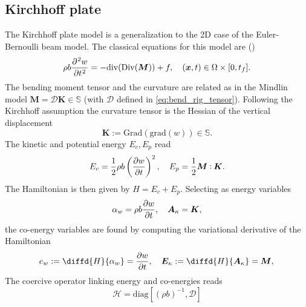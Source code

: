 \documentclass{ifacconf}
\def\onedot{$\mathsurround0pt\ldotp$}
\def\cddot{%
	\mathbin{\vcenter{\baselineskip.67ex
			\hbox{\onedot}\hbox{\onedot}}%
}}
\begin{document}
\subsection{Kirchhoff plate}
The Kirchhoff plate model is a generalization to the 2D case of the Euler-Bernoulli beam model. The classical equations for this model are (\cite{timoshenko1959theory}) 
\begin{equation}
\label{eq:clKir}
\displaystyle \rho b \diffp[2]{w}{t} = -\mathrm{div}(\mathrm{Div}(\bm{M})) + f, \quad (\bm{x}, t) \in \Omega \times [0, t_f].
\end{equation}
The bending moment tensor and the curvature are related as in the Mindlin model $\bm{M} = \mathcal{D} \bm{K} \in \mathbb{S}$ (with $\mathcal{D}$ defined in \eqref{eq:bend_rig_tensor}). Following the Kirchhoff assumption the curvature tensor is the Hessian of the vertical displacement
\begin{equation*}
\bm{K} := \mathrm{Grad}(\mathrm{grad}(w)) \in \mathbb{S}.
\end{equation*}
 The kinetic and potential energy $E_c, E_p$ read
\begin{equation}
E_c =  \frac{1}{2}\rho b \left(\diffp{w}{t} \right)^2, \quad
E_p = \frac{1}{2} \bm{M} \cddot \bm{K}.
\end{equation} 
The Hamiltonian is then given by $H=E_c + E_p$. Selecting as energy variables
\begin{equation}
\alpha_w = \rho b \diffp{w}{t}, \quad \bm{A}_{\kappa} = \bm{K}, 
\end{equation}
the co-energy variables are found by computing the variational derivative of the Hamiltonian
\begin{equation}
e_w := \diffd{H}{\alpha_w} = \diffp{w}{t}, \quad \bm{E}_{\kappa} := \diffd{H}{\bm{A}_{\kappa}} = \bm{M}, \\
\end{equation}
The coercive operator linking energy and co-energies reads
\begin{equation}
\mathcal{H} = \mathrm{diag}[(\rho b)^{-1}, \mathcal{D}]
\end{equation}
 
\end{document}
